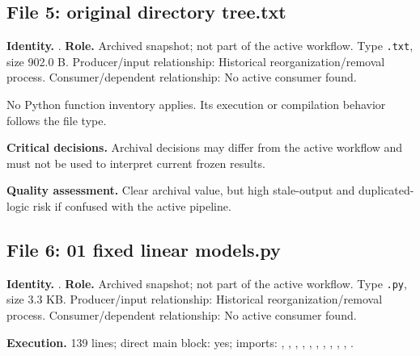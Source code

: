 \documentclass[
  11pt,
  a4paper]{article}
\begin{document}
\subsection{File 5: original directory
tree.txt}\label{file-700711866513906684}

\textbf{Identity.}
.
\textbf{Role.} Archived snapshot; not part of the active workflow. Type
\texttt{.txt}, size 902.0 B. Producer/input relationship: Historical
reorganization/removal process. Consumer/dependent relationship: No
active consumer found.

No Python function inventory applies. Its execution or compilation
behavior follows the file type.

\textbf{Critical decisions.} Archival decisions may differ from the
active workflow and must not be used to interpret current frozen
results.

\textbf{Quality assessment.} Clear archival value, but high stale-output
and duplicated-logic risk if confused with the active pipeline.

\subsection{File 6: 01 fixed linear
models.py}\label{file-7910650635732596626}

\textbf{Identity.}
.
\textbf{Role.} Archived snapshot; not part of the active workflow. Type
\texttt{.py}, size 3.3 KB. Producer/input relationship: Historical
reorganization/removal process. Consumer/dependent relationship: No
active consumer found.

\textbf{Execution.} 139 lines; direct main block: yes; imports:
, , ,
,
,
,
,
,
,
, .
\end{document}
